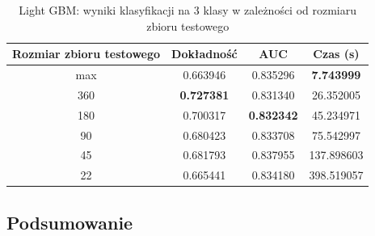 \documentclass[a4paper, twoside, 11pt, openright]{article}
\begin{document}
\begin{table}[H]
    \centering
    \begin{tabular}{|c|c|c|c|}
    \hline
        \textbf{Rozmiar zbioru testowego} & \textbf{Dokładność} & \textbf{AUC} & \textbf{Czas (s)} \\ \hline
max   						 &  0.663946 &  0.835296 &  \textbf{7.743999} \\ \hline
360                         &  \textbf{0.727381} &  0.831340 &   26.352005 \\ \hline
180                         &  0.700317 &  \textbf{0.832342} &   45.234971 \\ \hline
90                          &  0.680423 &  0.833708 &   75.542997 \\ \hline
45                          &  0.681793 &  0.837955 &  137.898603 \\ \hline
22                          &  0.665441 &  0.834180 &  398.519057 \\ \hline
    \end{tabular}
    \caption{Light GBM: wyniki klasyfikacji na 3 klasy w zależności od rozmiaru zbioru testowego}
    \label{tab:lgbm_walk_forward_discrete}
\end{table}


\subsection{Podsumowanie}
\end{document}
